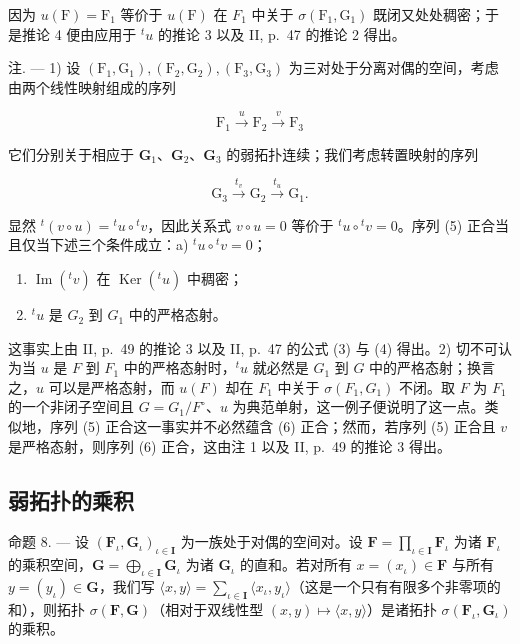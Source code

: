 因为 \(u(\mathrm{F}) = \mathrm{F}_{1}\) 等价于 \(u(\mathrm{F})\) 在 \(F_{1}\) 中关于 \(\sigma(\mathrm{F}_{1}, \mathrm{G}_{1})\) 既闭又处处稠密；于是推论 4 便由应用于 \(^{t}u\) 的推论 3 以及 II, p.~47 的推论 2 得出。

注. --- 1) 设 \((\mathrm{F}_1, \mathrm{G}_1), (\mathrm{F}_2, \mathrm{G}_2), (\mathrm{F}_3, \mathrm{G}_3)\) 为三对处于分离对偶的空间，考虑由两个线性映射组成的序列

\[
\mathrm{F} _ {1} \xrightarrow {u} \mathrm{F} _ {2} \xrightarrow {v} \mathrm{F} _ {3}\tag{5}
\]

它们分别关于相应于 \(\mathbf{G}_1\)、\(\mathbf{G}_2\)、\(\mathbf{G}_3\) 的弱拓扑连续；我们考虑转置映射的序列

\[
\mathrm{G} _ {3} \stackrel {{t _ {v}}} {{\to}} \mathrm{G} _ {2} \stackrel {{t _ {u}}} {{\to}} \mathrm{G} _ {1}.\tag{6}
\]

显然 \({}^t (v\circ u) = {}^t u\circ {}^tv\)，因此关系式 \(v\circ u = 0\) 等价于 \({}^t u\circ {}^tv = 0\)。序列 (5) 正合当且仅当下述三个条件成立：a) \({}^t u\circ {}^tv = 0\)；

\begin{enumerate}
\def\labelenumi{\alph{enumi})}
\setcounter{enumi}{1}
\item
  \(\operatorname{Im}(^{t}v)\) 在 \(\operatorname{Ker}(^{t}u)\) 中稠密；
\item
  \(^t u\) 是 \(G_2\) 到 \(G_1\) 中的严格态射。
\end{enumerate}

这事实上由 II, p.~49 的推论 3 以及 II, p.~47 的公式 (3) 与 (4) 得出。2) 切不可认为当 \(u\) 是 \(F\) 到 \(F_1\) 中的严格态射时，\(^t u\) 就必然是 \(G_1\) 到 \(G\) 中的严格态射；换言之，\(u\) 可以是严格态射，而 \(u(F)\) 却在 \(F_1\) 中关于 \(\sigma(F_1, G_1)\) 不闭。取 \(F\) 为 \(F_1\) 的一个非闭子空间且 \(G = G_1 / F^\circ\)、\(u\) 为典范单射，这一例子便说明了这一点。类似地，序列 (5) 正合这一事实并不必然蕴含 (6) 正合；然而，若序列 (5) 正合且 \(v\) 是严格态射，则序列 (6) 正合，这由注 1 以及 II, p.~49 的推论 3 得出。

\subsection{弱拓扑的乘积}

命题 8. --- 设 \((\mathbf{F}_{\iota}, \mathbf{G}_{\iota})_{\iota \in \mathbf{I}}\) 为一族处于对偶的空间对。设 \(\mathbf{F} = \prod_{\iota \in \mathbf{I}} \mathbf{F}_{\iota}\) 为诸 \(\mathbf{F}_{\iota}\) 的乘积空间，\(\mathbf{G} = \bigoplus_{\iota \in \mathbf{I}} \mathbf{G}_{\iota}\) 为诸 \(\mathbf{G}_{\iota}\) 的直和。若对所有 \(x = (x_{\iota}) \in \mathbf{F}\) 与所有 \(y = (y_{\iota}) \in \mathbf{G}\)，我们写 \(\langle x, y \rangle = \sum_{\iota \in \mathbf{I}} \langle x_{\iota}, y_{\iota} \rangle\)（这是一个只有有限多个非零项的和），则拓扑 \(\sigma(\mathbf{F}, \mathbf{G})\)（相对于双线性型 \((x, y) \mapsto \langle x, y \rangle\)）是诸拓扑 \(\sigma(\mathbf{F}_{\iota}, \mathbf{G}_{\iota})\) 的乘积。

